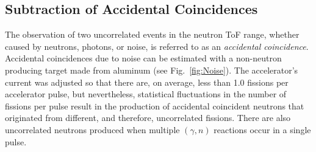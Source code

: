 \subsection{Subtraction of Accidental Coincidences}
\label{Reconstruction of Accidental Coincidence}
The observation of two uncorrelated events in the neutron ToF range, whether caused by neutrons, photons, or noise, is referred to as an \emph{accidental coincidence}.
Accidental coincidences due to noise can be estimated with a non-neutron producing target made from aluminum (see Fig.~\ref{fig:Noise}).
The accelerator's current was adjusted so that there are, on average, less than 1.0 fissions per accelerator pulse, but nevertheless, statistical fluctuations in the number of fissions per pulse result in the production of accidental coincident neutrons that originated from different, and therefore, uncorrelated fissions.
There are also uncorrelated neutrons produced when multiple $(\gamma, n)$ reactions occur in a single pulse.

